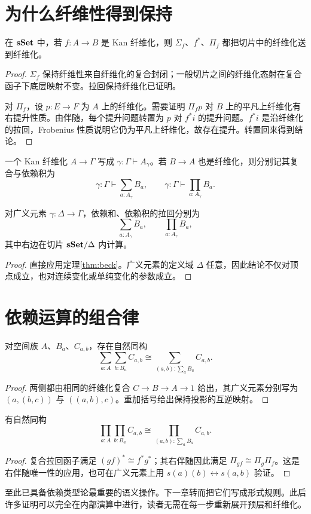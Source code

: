 \section{为什么纤维性得到保持}
\begin{proposition}
在 $\mathbf{sSet}$ 中，若 $f:A\to B$ 是 Kan 纤维化，则 $\Sigma_f$、$f^*$、$\Pi_f$ 都把切片中的纤维化送到纤维化。
\end{proposition}
\begin{proof}
$\Sigma_f$ 保持纤维性来自纤维化的复合封闭；一般切片之间的纤维化态射在复合函子下底层映射不变。拉回保持纤维化已证明。

对 $\Pi_f$，设 $p:E\to F$ 为 $A$ 上的纤维化。需要证明 $\Pi_fp$ 对 $B$ 上的平凡上纤维化有右提升性质。由伴随，每个提升问题转置为 $p$ 对 $f^*i$ 的提升问题。$f^*i$ 是沿纤维化的拉回，Frobenius 性质说明它仍为平凡上纤维化，故存在提升。转置回来得到结论。
\end{proof}
\begin{definition}[空间族的记号]
一个 Kan 纤维化 $A\to\Gamma$ 写成 $\gamma:\Gamma\vdash A_\gamma$。若 $B\to A$ 也是纤维化，则分别记其复合与依赖积为
\[
\gamma:\Gamma\vdash\sum_{a:A_\gamma}B_a,
\qquad
\gamma:\Gamma\vdash\prod_{a:A_\gamma}B_a.
\]
\end{definition}
\begin{proposition}[纤维计算]
对广义元素 $\gamma:\Delta\to\Gamma$，依赖和、依赖积的拉回分别为
\[
\sum_{a:A_\gamma}B_a,
\qquad\prod_{a:A_\gamma}B_a,
\]
其中右边在切片 $\mathbf{sSet}/\Delta$ 内计算。
\end{proposition}
\begin{proof}
直接应用定理\ref{thm:beck}。广义元素的定义域 $\Delta$ 任意，因此结论不仅对顶点成立，也对连续变化或单纯变化的参数成立。
\end{proof}

\section{依赖运算的组合律}
\begin{proposition}[依赖和的结合律]
对空间族 $A$、$B_a$、$C_{a,b}$，存在自然同构
\[
\sum_{a:A}\sum_{b:B_a}C_{a,b}
\cong\sum_{(a,b):\sum_aB_a}C_{a,b}.
\]
\end{proposition}
\begin{proof}
两侧都由相同的纤维化复合 $C\to B\to A\to1$ 给出，其广义元素分别写为 $(a,(b,c))$ 与 $((a,b),c)$。重加括号给出保持投影的互逆映射。
\end{proof}
\begin{proposition}[依赖积的柯里化]
有自然同构
\[
\prod_{a:A}\prod_{b:B_a}C_{a,b}
\cong\prod_{(a,b):\sum_aB_a}C_{a,b}.
\]
\end{proposition}
\begin{proof}
复合拉回函子满足 $(gf)^*\cong f^*g^*$；其右伴随因此满足 $\Pi_{gf}\cong\Pi_g\Pi_f$。这是右伴随唯一性的应用，也可在广义元素上用 $s(a)(b)\leftrightarrow s(a,b)$ 验证。
\end{proof}
\begin{remark}
至此已具备依赖类型论最重要的语义操作。下一章转而把它们写成形式规则。此后许多证明可以完全在内部演算中进行，读者无需在每一步重新展开预层和纤维化。
\end{remark}
